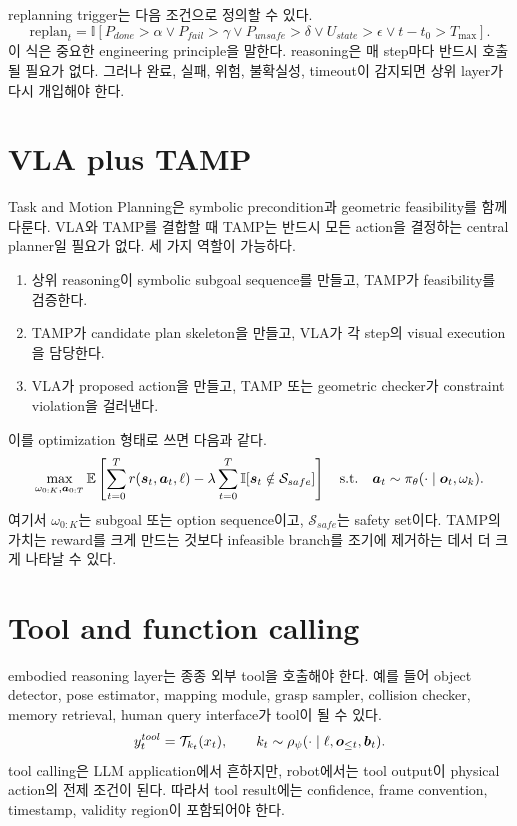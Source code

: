 replanning trigger는 다음 조건으로 정의할 수 있다.
\begin{equation}
  \mathrm{replan}_t
  =
  \mathbb{I}
  [
  P_{done} > \alpha
  \vee
  P_{fail} > \gamma
  \vee
  P_{unsafe} > \delta
  \vee
  U_{state} > \epsilon
  \vee
  t-t_0 > T_{\max}
  ].
  \label{eq:ch17-replan-trigger}
\end{equation}
이 식은 중요한 engineering principle을 말한다. reasoning은 매 step마다 반드시 호출될 필요가 없다. 그러나 완료, 실패, 위험, 불확실성, timeout이 감지되면 상위 layer가 다시 개입해야 한다.

\section{VLA plus TAMP}

Task and Motion Planning은 symbolic precondition과 geometric feasibility를 함께 다룬다. VLA와 TAMP를 결합할 때 TAMP는 반드시 모든 action을 결정하는 central planner일 필요가 없다. 세 가지 역할이 가능하다.

\begin{enumerate}
  \item 상위 reasoning이 symbolic subgoal sequence를 만들고, TAMP가 feasibility를 검증한다.
  \item TAMP가 candidate plan skeleton을 만들고, VLA가 각 step의 visual execution을 담당한다.
  \item VLA가 proposed action을 만들고, TAMP 또는 geometric checker가 constraint violation을 걸러낸다.
\end{enumerate}

이를 optimization 형태로 쓰면 다음과 같다.
\begin{equation}
  \max_{\omega_{0:K}, \bm{a}_{0:T}}
  \mathbb{E}
  \left[
  \sum_{t=0}^{T} r(\bm{s}_t,\bm{a}_t,\ell)
  -
  \lambda
  \sum_{t=0}^{T}
  \mathbb{I}[\bm{s}_t \notin \mathcal{S}_{safe}]
  \right]
  \quad
  \mathrm{s.t.}\quad
  \bm{a}_t \sim \pi_{\theta}(\cdot \mid \bm{o}_t,\omega_k).
  \label{eq:ch17-hier-objective}
\end{equation}
여기서 $\omega_{0:K}$는 subgoal 또는 option sequence이고, $\mathcal{S}_{safe}$는 safety set이다. TAMP의 가치는 reward를 크게 만드는 것보다 infeasible branch를 조기에 제거하는 데서 더 크게 나타날 수 있다.

\section{Tool and function calling}

embodied reasoning layer는 종종 외부 tool을 호출해야 한다. 예를 들어 object detector, pose estimator, mapping module, grasp sampler, collision checker, memory retrieval, human query interface가 tool이 될 수 있다.
\begin{equation}
  y_t^{tool}
  =
  \mathcal{T}_{k_t}
  (x_t),
  \qquad
  k_t
  \sim
  \rho_{\psi}
  (\cdot \mid \ell,\bm{o}_{\leq t},\bm{b}_t).
  \label{eq:ch17-tool-call}
\end{equation}
tool calling은 LLM application에서 흔하지만, robot에서는 tool output이 physical action의 전제 조건이 된다. 따라서 tool result에는 confidence, frame convention, timestamp, validity region이 포함되어야 한다.

